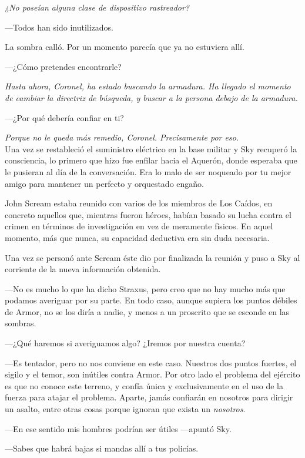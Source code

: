 \emph{¿No poseían alguna clase de dispositivo rastreador?}

---Todos han sido inutilizados.

La sombra calló. Por un momento parecía que ya no estuviera allí.

---¿Cómo pretendes encontrarle?

\emph{Hasta ahora, Coronel, ha estado buscando la armadura. Ha llegado el momento de cambiar la directriz de búsqueda, y buscar a la persona debajo de la armadura.}

---¿Por qué debería confiar en ti?

\emph{Porque no le queda más remedio, Coronel. Precisamente por eso.}\\

\noindent{}Una vez se restableció el suministro eléctrico en la base militar y Sky recuperó la consciencia, lo primero que hizo fue enfilar hacia el Aquerón, donde esperaba que le pusieran al día de la conversación. Era lo malo de ser noqueado por tu mejor amigo para mantener un perfecto y orquestado engaño.

John Scream estaba reunido con varios de los miembros de Los Caídos, en concreto aquellos que, mientras fueron héroes, habían basado su lucha contra el crimen en términos de investigación en vez de meramente físicos. En aquel momento, más que nunca, su capacidad deductiva era sin duda necesaria.

Una vez se personó ante Scream éste dio por finalizada la reunión y puso a Sky al corriente de la nueva información obtenida.

---No es mucho lo que ha dicho Straxus, pero creo que no hay mucho más que podamos averiguar por su parte. En todo caso, aunque supiera los puntos débiles de Armor, no se los diría a nadie, y menos a un proscrito que se esconde en las sombras.

---¿Qué haremos si averiguamos algo? ¿Iremos por nuestra cuenta?

---Es tentador, pero no nos conviene en este caso. Nuestros dos puntos fuertes, el sigilo y el temor, son inútiles contra Armor. Por otro lado el problema del ejército es que no conoce este terreno, y confía única y exclusivamente en el uso de la fuerza para atajar el problema. Aparte, jamás confiarán en nosotros para dirigir un asalto, entre otras cosas porque ignoran que exista un \emph{nosotros}.

---En ese sentido mis hombres podrían ser útiles ---apuntó Sky.

---Sabes que habrá bajas si mandas allí a tus policías.

